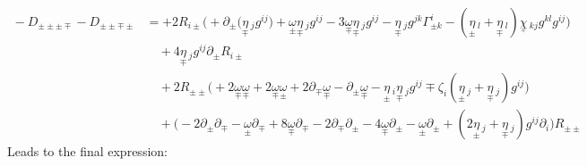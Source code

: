 \documentclass[a4paper,11pt]{article}
\begin{document}
\begin{align*}
    \!\!\!\!\!\!\!\!\!\!
    - D_{\pm\pm\pm\mp} -D_{\pm\pm\mp\pm}
    &=
    + 2 R_{i \pm} \Big(
    + \partial_\pm\big(\underset{\mp}{\eta}\,_j g^{ij} \big)
    + \underset{\pm}{\omega} \underset{\mp}{\eta}\,_j g^{ij}
    -3 \underset{\mp}{\omega} \underset{\mp}{\eta}\,_j g^{ij}
    - \underset{\mp}{\eta}\,_j g^{jk} \Gamma_{\pm k}^i
    -  (\underset{\pm}{\eta}\,_l + \underset{\mp}{\eta}\,_l)  \underset{_\mp}{\chi}\,_{kj} g^{kl} g^{ij}  \Big)\\
    &\quad 
    +4 \underset{\mp}{\eta}\,_j g^{ij} \partial_\pm R_{i \pm}\\
    &\quad
    + 2 R_{\pm\pm} \Big(
    + 2 \underset{\mp}{\omega}\underset{\mp}{\omega}
    + 2 \underset{\mp}{\omega} \underset{\pm}{\omega}
    +2 \partial_\mp\underset{\mp}{\omega} 
    - \partial_\pm \underset{\mp}{\omega}
    - \underset{\pm}{\eta}\,_{i} \underset{\mp}{\eta}\,_{ j} g^{ij}  
     \mp  \zeta_i(\underset{\pm}{\eta}\,_{ j}+\underset{\mp}{\eta}\,_j)  g^{ij}\Big)\\
    &\quad 
    +  \Big(
    -2 \partial_\pm\partial_\mp
    -\underset{\pm}{\omega} \partial_\mp
    +8 \underset{\mp}{\omega} \partial_\mp
    -2 \partial_\mp \partial_\pm
    -4 \underset{\mp}{\omega} \partial_\pm
    -\underset{\pm}{\omega} \partial_\pm
    + (2\underset{\pm}{\eta}\,_{ j} + \underset{\mp}{\eta}\,_j) g^{ij}\partial_i
    \Big) R_{\pm\pm}
\end{align*}
Leads to the final expression:
\end{document}
